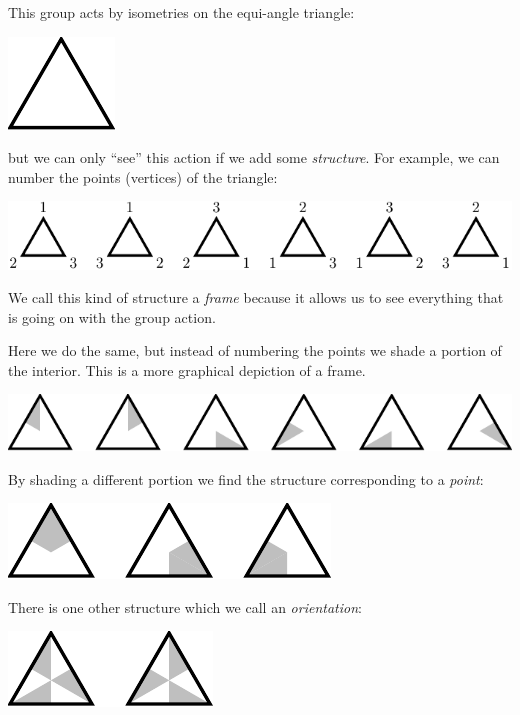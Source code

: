 \documentclass[11pt,oneside]{article}
\begin{document}
This group acts by isometries on the equi-angle triangle:
\begin{center}
\includegraphics[]{pic-triangle.pdf} 
\end{center}
but we can only ``see'' this action if we add some
\emph{structure}. 
For example, we can number the
points (vertices) of the triangle:
\begin{center}
\includegraphics[]{pic-triangle-numbered.pdf} 
\end{center}
We call this kind of structure a \emph{frame}
because it allows us to see everything that is going on
with the group action.

Here we do the same, but instead of numbering the points
we shade a portion of the interior.
This is a more graphical depiction of a frame.
\begin{center}
\includegraphics[]{pic-triangle-frames.pdf} 
\end{center}
By shading a different portion we find the structure
corresponding to a \emph{point}:
\begin{center}
\includegraphics[]{pic-triangle-points.pdf} 
\end{center}
There is one other structure which we call an \emph{orientation}:
\begin{center}
\includegraphics[]{pic-triangle-orientations.pdf} 
\end{center}
\end{document}
